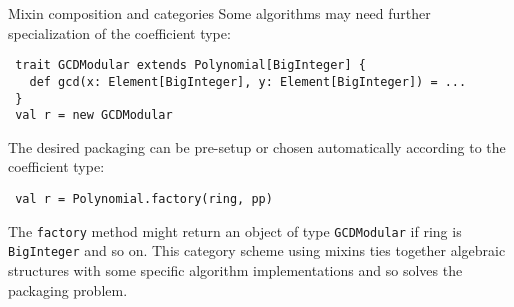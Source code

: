 \documentclass[final]{beamer}
\newcommand{\code}[1]{\texttt{#1}}
\begin{document}
\begin{frame}[fragile]
\begin{columns}[t]
\begin{column}{.3\linewidth}
\begin{block}{\large Mixin composition and categories}
{Some algorithms may need further specialization of the coefficient
type:}
\begin{lstlisting}
 trait GCDModular extends Polynomial[BigInteger] {
   def gcd(x: Element[BigInteger], y: Element[BigInteger]) = ...
 }
 val r = new GCDModular
\end{lstlisting}
{\footnotesize The desired packaging can be pre-setup or chosen
automatically according to the coefficient type:}
\begin{lstlisting}
 val r = Polynomial.factory(ring, pp)
\end{lstlisting}
{\footnotesize The \code{factory} method might return an object of type
\code{GCDModular} if ring is \code{BigInteger} and so on.
This category scheme using mixins ties together algebraic structures
with some specific algorithm implementations and so solves the packaging
problem.}
  \end{block}
\end{column}

\end{columns}

\end{frame}


%
%
%
\end{document}
